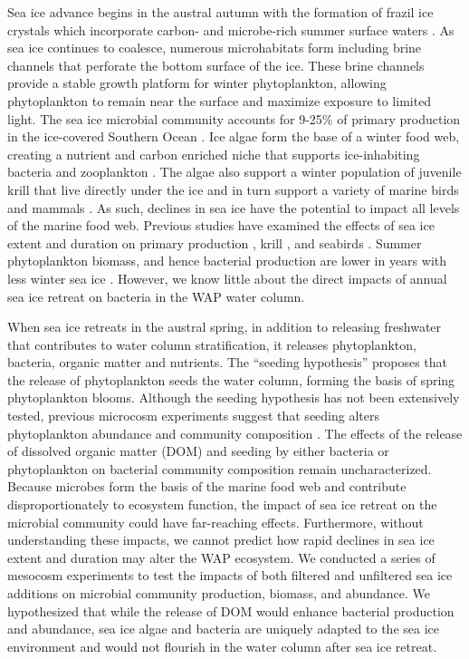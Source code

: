 Sea ice advance begins in the austral autumn with the formation of frazil ice crystals which incorporate carbon- and microbe-rich summer surface waters \citep{Garrison1996-ro}. As sea ice continues to coalesce, numerous microhabitats form including brine channels that perforate the bottom surface of the ice. These brine channels provide a stable growth platform for winter phytoplankton, allowing phytoplankton to remain near the surface and maximize exposure to limited light. The sea ice microbial community accounts for 9-25\% of primary production in the ice-covered Southern Ocean \citep{Arrigo1997-bj}. Ice algae form the base of a winter food web, creating a nutrient and carbon enriched niche that supports ice-inhabiting bacteria and zooplankton \citep{Garrison1989-sn}. The algae also support a winter population of juvenile krill that live directly under the ice and in turn support a variety of marine birds and mammals \citep{Ducklow2007-ns}. As such, declines in sea ice have the potential to impact all levels of the marine food web. Previous studies have examined the effects of sea ice extent and duration on primary production \citep{Vernet2008-on}, krill \citep{Ross2000-mm}, and seabirds \citep{Croxall2002-ja}. Summer phytoplankton biomass, and hence bacterial production are lower in years with less winter sea ice \citep{saba2014winter, dsvse12}. However, we know little about the direct impacts of annual sea ice retreat on bacteria in the WAP water column.

 

When sea ice retreats in the austral spring, in addition to releasing freshwater that contributes to water column stratification, it releases phytoplankton, bacteria, organic matter and nutrients. The ``seeding hypothesis'' proposes that the release of phytoplankton seeds the water column, forming the basis of spring phytoplankton blooms. Although the seeding hypothesis has not been extensively tested, previous microcosm experiments suggest that seeding alters phytoplankton abundance and community composition \citep{Kuosa1992-vk,Giesenhagen1999-kq}. The effects of the release of dissolved organic matter (DOM) and seeding by either bacteria or phytoplankton on bacterial community composition remain uncharacterized. Because microbes form the basis of the marine food web and contribute disproportionately to ecosystem function, the impact of sea ice retreat on the microbial community could have far-reaching effects. Furthermore, without understanding these impacts, we cannot predict how rapid declines in sea ice extent and duration may alter the WAP ecosystem. We conducted a series of mesocosm experiments to test the impacts of both filtered and unfiltered sea ice additions on microbial community production, biomass, and abundance. We hypothesized that while the release of DOM would enhance bacterial production and abundance, sea ice algae and bacteria are uniquely adapted to the sea ice environment and would not flourish in the water column after sea ice retreat. 

